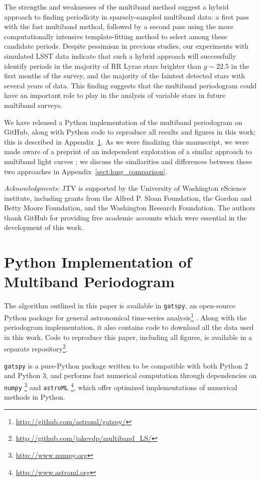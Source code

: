\documentclass{emulateapj}
\newcommand{\App}[1]{Appendix~\ref{sect:#1}}
\newcommand{\app}[1]{\App{#1}}
\newcommand{\sectlabel}[1]{\label{sect:#1}}
\begin{document}
The strengths and weaknesses of the multiband method suggest a hybrid approach to finding periodicity in sparsely-sampled multiband data: a first pass with the fast multiband method, followed by a second pass using the more computationally intensive template-fitting method to select among these candidate periods.
Despite pessimism in previous studies, our experiments with simulated LSST data indicate that such a hybrid approach will successfully identify periods in the majority of RR Lyrae stars brighter than $g\sim 22.5$ in the first months of the survey, and the majority of the faintest detected stars with several years of data.
This finding suggests that the multiband periodogram could have an important role to play in the analysis of variable stars in future multiband surveys.

We have released a Python implementation of the multiband periodogram on GitHub, along with Python code to reproduce all results and figures in this work; this is described in \app{gatspy}.
As we were finalizing this manuscript, we were made aware of a preprint of an independent exploration of a similar approach to multiband light curves \citep{Long2014}; we discuss the similarities and differences between these two approaches in \app{long_comparison}.

{\it Acknowledgments:} JTV is supported by the University of Washington eScience institute, including grants from the Alfred P. Sloan Foundation, the Gordon and Betty Moore Foundation, and the Washington Research Foundation. The authors thank GitHub for providing free academic accounts which were essential in the development of this work.





\appendix
\section{Python Implementation of Multiband Periodogram}
\sectlabel{gatspy}
The algorithm outlined in this paper is available in {\tt gatspy}, an open-source Python package for general astronomical time-series analysis\footnote{\url{http://github.com/astroml/gatspy/}} \citep{gatspy}. Along with the periodogram implementation, it also contains code to download all the data used in this work. Code to reproduce this paper, including all figures, is available in a separate repository\footnote{\url{http://github.com/jakevdp/multiband\_LS/}}.

{\tt gatspy} is a pure-Python package written to be compatible with both Python 2 and Python 3, and performs fast numerical computation through dependencies on {\tt numpy} \citep{numpy}\footnote{\url{http://www.numpy.org}} and {\tt astroML} \citep{astroML}\footnote{\url{http://www.astroml.org}}, which offer optimized implementations of numerical methods in Python.
\end{document}

